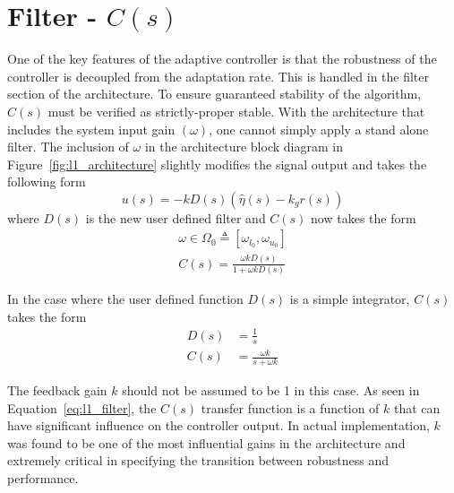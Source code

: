 \section{\Lone Filter - $C(s)$}\label{sec:l1_filter}
One of the key features of the \Lone adaptive controller is that the robustness of the controller is decoupled from the adaptation rate.  This is handled in the filter section of the \Lone architecture.  To ensure guaranteed stability of the \Lone algorithm, $C(s)$ must be verified as strictly-proper stable.  With the architecture that includes the system input gain $(\omega)$, one cannot simply apply a stand alone filter.  The inclusion of $\omega$ in the architecture block diagram in Figure~\ref{fig:l1_architecture} slightly modifies the signal output and takes the following form
\begin{equation}
u(s)=-kD(s)(\hat{\eta}(s)-k_gr(s))
\end{equation}
where $D(s)$ is the new user defined filter and $C(s)$ now takes the form
\begin{equation}
\begin{split}
\omega \in \Omega_0 \triangleq [\omega_{l_0},\omega_{u_0}]\\
C(s)=\frac{\omega kD(s)}{1+\omega kD(s)}
\end{split}
\end{equation}

In the case where the user defined function $D(s)$ is a simple integrator, $C(s)$ takes the form
\begin{equation}\label{eq:l1_filter}
\begin{split}
D(s)&=\frac{1}{s}\\
C(s)&=\frac{\omega k}{s+\omega k}
\end{split}
\end{equation}

The feedback gain $k$ should not be assumed to be 1 in this case.  As seen in Equation~\ref{eq:l1_filter}, the $C(s)$ transfer function is a function of $k$ that can have significant influence on the controller output.  In actual implementation, $k$ was found to be one of the most influential gains in the architecture and extremely critical in specifying the transition between robustness and performance.


